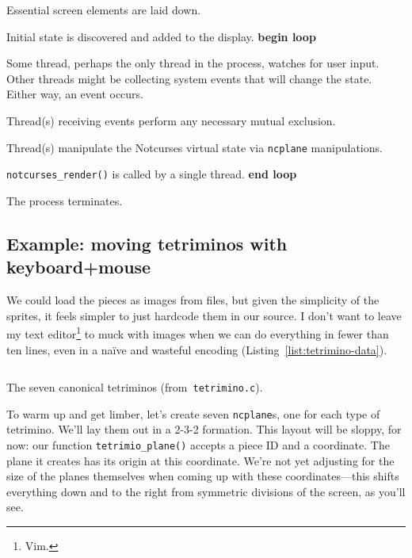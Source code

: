 \begin{denseitemize}
\item{Essential screen elements are laid down.}
\item{Initial state is discovered and added to the display.}
\textbf{begin loop} 
\item{Some thread, perhaps the only thread in the process, watches
    for user input. Other threads might be collecting system events that will
    change the state. Either way, an event occurs.}
\item{Thread(s) receiving events perform any necessary mutual exclusion.}
\item{Thread(s) manipulate the Notcurses virtual state via \texttt{ncplane} manipulations.}
\item{\texttt{notcurses\_render()} is called by a single thread.}
\textbf{end loop}
\item{The process terminates.}
\end{denseitemize}

\subsection{Example: moving tetriminos with keyboard+mouse}

We could load the pieces as images from files, but given the simplicity of the
sprites, it feels simpler to just hardcode them in our source. I don't want to
leave my text editor\footnote{Vim.} to muck with images when we can do everything
in fewer than ten lines, even in a naïve and wasteful encoding (Listing~\ref{list:tetrimino-data}).

\begin{listing}[!htbp]
\inputminted[]{C}{code/tetrimino-data.h}
\caption{The seven canonical tetriminos (from~\texttt{tetrimino.c}).}
\label{list:tetrimino-data}
\end{listing}

To warm up and get limber, let's create seven \texttt{ncplane}s, one for each type
of tetrimino. We'll lay them out in a 2-3-2 formation. This layout will be
sloppy, for now: our function
\texttt{tetrimio\_plane()} accepts a piece ID and a coordinate.
The plane it creates has its origin at this coordinate.
We're not yet adjusting for the size of the planes themselves when coming
up with these coordinates---this shifts everything down and to the right from
symmetric divisions of the screen, as you'll see.

